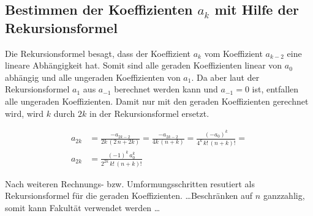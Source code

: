 \subsection[Bestimmen der Koeffizienten $a_k$]{Bestimmen der Koeffizienten $a_k$ mit Hilfe der Rekursionsformel }
\begin{normalsize}
Die Rekursionsformel  besagt,
dass der Koeffizient $a_k$ vom Koeffizient $a_{k-2}$ eine lineare Abh\"angigkeit hat.
Somit sind alle geraden Koeffizienten linear von $a_0$ abh\"angig und alle un\-geraden Koeffizienten von $a_1$.
Da aber laut der Rekursionsformel  $a_1$ aus $a_{-1}$ berechnet werden kann und $a_{-1} = 0$ ist,
entfallen alle ungeraden Koeffizienten.
Damit nur mit den geraden Koeffizienten gerechnet wird,
wird $k$ durch $2k$ in der Rekursionsformel  ersetzt.
\end{normalsize}
\begin{align}
	\nonumber
	a_{2k}
	&=
	\frac
	{
		-a_{2k - 2}
	}{
		2k \, \left( 2 \, n + 2k \right)	
	}
	=
	\frac
	{
		-a_{2k - 2}
	}{
		4k \, \left( n + k \right)	
	} 
	=
	\frac
	{
		\left( -a_0 \right) ^k
	}{
		4^k \, {k}! \, {\left( n + k \right)}!
	}
	=
	\\
	a_{2k}
	&= 
	\frac
	{
		\left( -1 \right) ^k \, a_0 ^k
	}{
		2^{2k} \, {k}! \, {\left( n + k \right)}!
	}
	\label{eq:bessel:koeffizienten:gerade}
\end{align}
\begin{normalsize}
Nach weiteren Rechnungs- \acs{bzw.} Umformungsschritten resutiert  als Rekursionsformel f\"ur die geraden Koeffizienten.
\dots Beschr\"anken auf $n$ ganzzahlig, somit kann Fakult\"at verwendet werden \dots
\end{normalsize}
